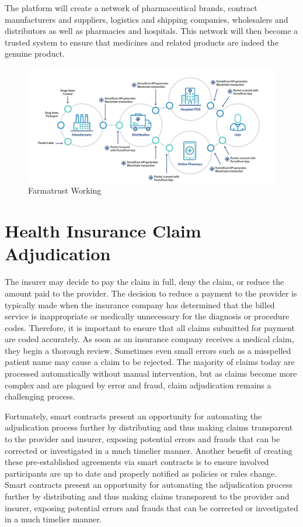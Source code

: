 \documentclass[12pt]{report}
\begin{document}
The platform will create a network of pharmaceutical brands, contract manufacturers and suppliers, logistics and shipping companies, wholesalers and distributors as well as pharmacies and hospitals. This network will then become a trusted system to ensure that medicines and related products are indeed the genuine product.
\begin{figure}[H]
\centering
\includegraphics[width=1.1\textwidth]{farma.png}
\caption{Farmatrust Working}
\label{farmatrust}
\end{figure}


\section{Health Insurance Claim Adjudication}
The insurer may decide to pay the claim in full, deny the claim, or reduce the amount
paid to the provider. The decision to reduce a payment to the provider is typically made when
the insurance company has determined that the billed service is inappropriate or medically
unnecessary for the diagnosis or procedure codes. Therefore, it is important to ensure that all
claims submitted for payment are coded accurately. As soon as an insurance company receives a medical claim, they begin a thorough review. Sometimes even small errors such as a misspelled patient name may cause a claim to be rejected. The majority of claims today
are processed automatically without manual intervention, but as claims become more complex and are plagued by error and fraud, claim adjudication remains a challenging process.
\newline
\par Fortunately, smart contracts present
an opportunity for automating the adjudication process further by distributing and thus making claims transparent to the provider and insurer, exposing potential errors and frauds that
can be corrected or investigated in a much timelier manner. Another benefit of creating these
pre-established agreements via smart contracts is to ensure involved participants are up to date and properly notified as policies or rules change.
Smart contracts present
an opportunity for automating the adjudication process further by distributing and thus making claims transparent to the provider and insurer, exposing potential errors and frauds that
can be corrected or investigated in a much timelier manner.
\end{document}
